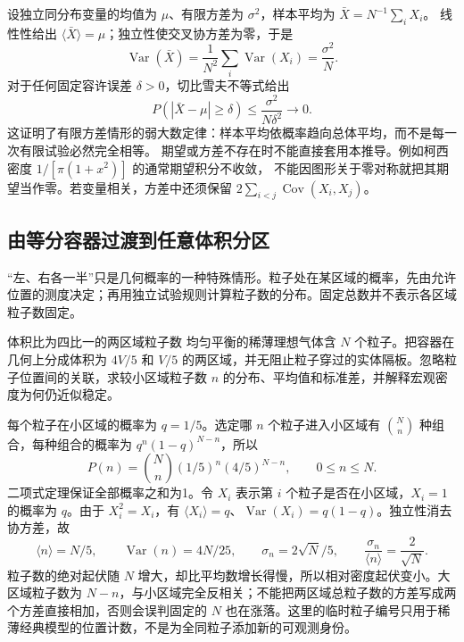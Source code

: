 设独立同分布变量的均值为 $\mu$、有限方差为 $\sigma^2$，样本平均为 $\bar X=N^{-1}\sum_iX_i$。
线性性给出 $\langle\bar X\rangle=\mu$；独立性使交叉协方差为零，于是
\[\operatorname{Var}(\bar X)=\frac1{N^2}\sum_i\operatorname{Var}(X_i)
=\frac{\sigma^2}{N}.\]
对于任何固定容许误差 $\delta>0$，切比雪夫不等式给出
\[P(|\bar X-\mu|\ge\delta)\le\frac{\sigma^2}{N\delta^2}\longrightarrow0.\]
这证明了有限方差情形的弱大数定律：样本平均依概率趋向总体平均，而不是每一次有限试验必然完全相等。
期望或方差不存在时不能直接套用本推导。例如柯西密度 $1/[\pi(1+x^2)]$ 的通常期望积分不收敛，
不能因图形关于零对称就把其期望当作零。若变量相关，方差中还须保留 $2\sum_{i<j}\operatorname{Cov}(X_i,X_j)$。


\subsection{由等分容器过渡到任意体积分区}
“左、右各一半”只是几何概率的一种特殊情形。粒子处在某区域的概率，先由允许位置的测度决定；再用独立试验规则计算粒子数的分布。固定总数并不表示各区域粒子数固定。

\Needspace{180pt}
\begin{origexamplebox}{体积比为四比一的两区域粒子数}\label{ch18:ex:teaching-asymmetric-binomial}
均匀平衡的稀薄理想气体含 $N$ 个粒子。把容器在几何上分成体积为 $4V/5$ 和 $V/5$ 的两区域，并无阻止粒子穿过的实体隔板。忽略粒子位置间的关联，求较小区域粒子数 $n$ 的分布、平均值和标准差，并解释宏观密度为何仍近似稳定。

\StatQAsymmetric
\end{origexamplebox}
\Needspace{65pt}
\begin{xesolution}
每个粒子在小区域的概率为 $q=1/5$。选定哪 $n$ 个粒子进入小区域有 $\binom Nn$ 种组合，每种组合的概率为 $q^n(1-q)^{N-n}$，所以
\[
 P(n)=\binom Nn(1/5)^n(4/5)^{N-n},\qquad 0\le n\le N.
\]
二项式定理保证全部概率之和为1。令 $X_i$ 表示第 $i$ 个粒子是否在小区域，$X_i=1$ 的概率为 $q$。由于 $X_i^2=X_i$，有 $\langle X_i\rangle=q$、$\operatorname{Var}(X_i)=q(1-q)$。独立性消去协方差，故
\[
 \langle n\rangle=N/5,\qquad \operatorname{Var}(n)=4N/25,
 \qquad \sigma_n=2\sqrt N/5,\qquad
 \frac{\sigma_n}{\langle n\rangle}=\frac2{\sqrt N}.
\]
粒子数的绝对起伏随 $N$ 增大，却比平均数增长得慢，所以相对密度起伏变小。大区域粒子数为 $N-n$，与小区域完全反相关；不能把两区域总粒子数的方差写成两个方差直接相加，否则会误判固定的 $N$ 也在涨落。这里的临时粒子编号只用于稀薄经典模型的位置计数，不是为全同粒子添加新的可观测身份。

\StatAAsymmetric
\end{xesolution}

